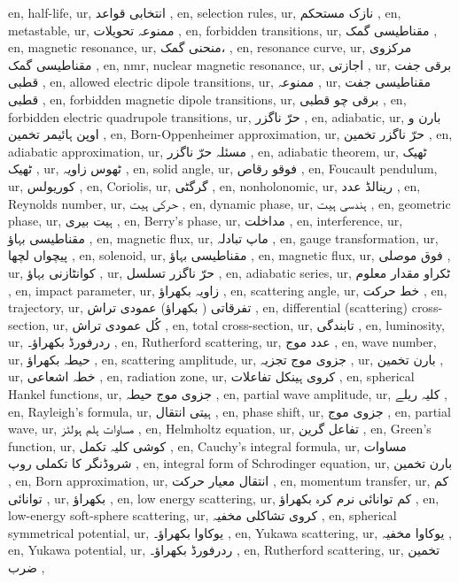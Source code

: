 en, half-life,
ur,  انتخابی قواعد ,
en, selection rules,
ur, نازک مستحکم  ,
en, metastable,
ur,  ممنوعہ تحویلات ,
en, forbidden transitions,
ur, مقناطیسی گمک ,
en, magnetic resonance,
ur, منحنی گمک، ,
en, resonance curve,
ur, مرکزوی مقناطیسی گمک ,
en, nmr, nuclear magnetic resonance,
ur,  اجازتی ,
ur,  برقی جفت قطبی ,
en, allowed electric dipole transitions,
ur,  ممنوعہ ,
ur, مقناطیسی جفت قطبی ,
en, forbidden magnetic dipole transitions,
ur, برقی چو قطبی ,
en, forbidden electric quadrupole transitions,
ur,  حرّ ناگزر ,
en, adiabatic,
ur, بارن و اوپن ہائیمر تخمین ,
en, Born-Oppenheimer approximation,
ur,  حرّ ناگزر تخمین ,
en, adiabatic approximation,
ur,  مسئلہ حرّ ناگزر ,
en, adiabatic theorem,
ur, ٹھیک ٹھیک ,
ur, ٹھوس زاویہ ,
en, solid angle,
ur, فوقو رقاص ,
en, Foucault pendulum,
ur, کوریولس ,
en, Coriolis,
ur,  گرگٹی ,
en, nonholonomic,
ur,  رینالڈ عدد ,
en, Reynolds number,
ur, حرکی ہیت ,
en, dynamic phase,
ur,  ہندسی ہیت ,
en, geometric phase,
ur,  ہیت بیری ,
en, Berry's phase,
ur,  مداخلت ,
en, interference,
ur, مقناطیسی بہاؤ ,
en, magnetic flux,
ur, ماپ تبادلہ ,
en, gauge transformation,
ur, پیچواں لچھا ,
en, solenoid,
ur,  مقناطیسی بہاؤ ,
en, magnetic flux,
ur, فوق موصلی ,
ur, کوانٹازنی بہاؤ ,
ur, حرّ ناگزر تسلسل ,
en, adiabatic series,
ur, ٹکراو مقدار معلوم ,
en, impact parameter,
ur,  زاویہ بکھراؤ ,
en, scattering angle,
ur, خط حرکت ,
en, trajectory,
ur, تفرقاتی ( بکھراؤ) عمودی تراش ,
en, differential (scattering) cross-section,
ur, کُل عمودی تراش ,
en, total cross-section,
ur, تابندگی ,
en, luminosity,
ur, ردرفورڈ بکھراؤ۔ ,
en, Rutherford scattering,
ur,  عدد موج ,
en, wave number,
ur, حیطہ بکھراؤ ,
en, scattering amplitude,
ur, جزوی موج تجزیہ ,
ur, بارن تخمین ,
ur, خطہ اشعاعی ,
en, radiation zone,
ur, کروی ہینکل تفاعلات ,
en, spherical Hankel functions,
ur, جزوی موج حیطہ ,
en, partial wave amplitude,
ur, کلیہ ریلے ,
en, Rayleigh's formula,
ur,  ہیتی انتقال ,
en, phase shift,
ur, جزوی موج  ,
en, partial wave,
ur, مساوات ہلم ہولٹز ,
en, Helmholtz equation,
ur,  تفاعل گرین ,
en, Green's function,
ur, کوشی کلیہ تکمل ,
en, Cauchy's integral formula,
ur,  مساوات شروڈنگر کا تکملی روپ ,
en, integral form of Schrodinger equation,
ur, بارن تخمین ,
en, Born approximation,
ur, انتقال معیار حرکت ,
en, momentum transfer,
ur, کم توانائی ,
ur,  بکھراؤ ,
en, low energy scattering,
ur, کم توانائی نرم کرہ بکھراؤ ,
en, low-energy soft-sphere scattering,
ur, کروی تشاکلی مخفیہ ,
en, spherical symmetrical potential,
ur, یوکاوا بکھراؤ۔ ,
en, Yukawa scattering,
ur, یوکاوا مخفیہ ,
en, Yukawa potential,
ur, ردرفورڈ بکھراؤ۔ ,
en, Rutherford scattering,
ur, تخمین ضرب ,

